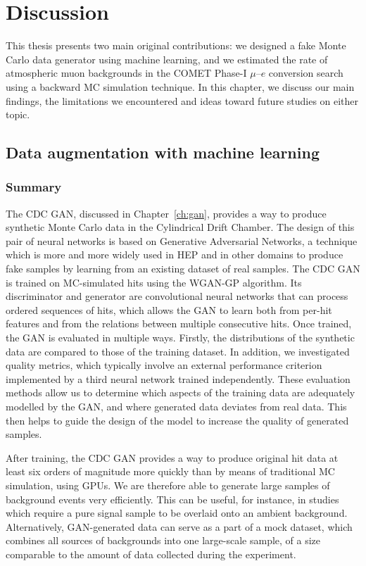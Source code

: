 \chapter{Discussion}

This thesis presents two main original contributions: we designed a fake Monte
Carlo data generator using machine learning, and we estimated the rate of
atmospheric muon backgrounds in the COMET Phase-I $\mu$--$e$ conversion search
using a backward MC simulation technique. In this chapter, we discuss our main
findings, the limitations we encountered and ideas toward future studies on
either topic.

\section{Data augmentation with machine learning}
\subsection{Summary}
The CDC GAN, discussed in Chapter~\ref{ch:gan}, provides a way to produce
synthetic Monte Carlo data in the Cylindrical Drift Chamber. The design of this
pair of neural networks is based on Generative Adversarial Networks, a technique
which is more and more widely used in HEP and in other domains to produce fake
samples by learning from an existing dataset of real samples. The CDC GAN is
trained on MC-simulated hits using the WGAN-GP algorithm. Its discriminator and
generator are convolutional neural networks that can process ordered sequences
of hits, which allows the GAN to learn both from per-hit features and from the
relations between multiple consecutive hits. Once trained, the GAN is evaluated
in multiple ways. Firstly, the distributions of the synthetic data are compared
to those of the training dataset. In addition, we investigated quality metrics,
which typically involve an external performance criterion implemented by a third
neural network trained independently. These evaluation methods allow us to
determine which aspects of the training data are adequately modelled by the GAN,
and where generated data deviates from real data. This then helps to guide the
design of the model to increase the quality of generated samples.

After training, the CDC GAN provides a way to produce original hit data at least
six orders of magnitude more quickly than by means of traditional MC simulation,
using GPUs. We are therefore able to generate large samples of background events
very efficiently. This can be useful, for instance, in studies which require a
pure signal sample to be overlaid onto an ambient background. Alternatively,
GAN-generated data can serve as a part of a mock dataset, which combines all
sources of backgrounds into one large-scale sample, of a size comparable to the
amount of data collected during the experiment.

